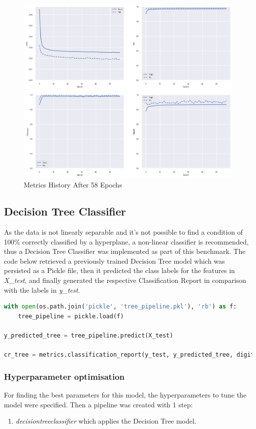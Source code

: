 \documentclass{article}
\begin{document}
\begin{figure}
\centering
\includegraphics[width=1\textwidth]{ann_metrics.png}
\caption{\label{fig:ann_metrics}Metrics History After 58 Epochs}
\end{figure}

\subsection{Decision Tree Classifier}
As the data is not linearly separable and it's not possible to find a condition of 100\% correctly classified by a hyperplane, a non-linear classifier is recommended, thus a Decision Tree Classifier was implemented as part of this benchmark. The code below retrieved a previously trained Decision Tree model which was persisted as a Pickle file, then it predicted the class labels for the features in \emph{X\_test}, and finally generated the respective Classification Report in comparison with the labels in \emph{y\_test}.

\begin{lstlisting}[language=Python]
with open(os.path.join('pickle', 'tree_pipeline.pkl'), 'rb') as f:     
    tree_pipeline = pickle.load(f)
    
y_predicted_tree = tree_pipeline.predict(X_test)

cr_tree = metrics.classification_report(y_test, y_predicted_tree, digits=5)
\end{lstlisting}

\subsubsection{Hyperparameter optimisation}
For finding the best parameters for this model, the hyperparameters to tune the model were specified. Then a pipeline was created with 1 step:
\begin{enumerate}
\item \emph{decisiontreeclassifier} which applies the Decision Tree model.
\end{enumerate}
\end{document}
